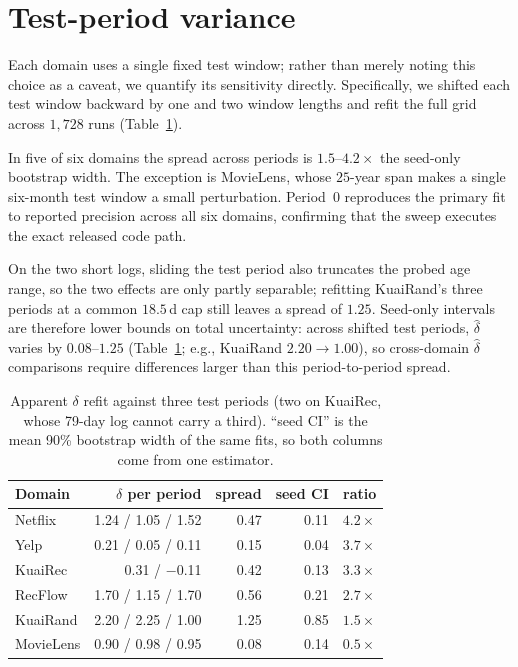 \documentclass[10pt,letterpaper]{article}
\begin{document}
\section{Test-period variance}
\label{sup:periods}

Each domain uses a single fixed test window; rather than merely noting this choice as a caveat, we quantify its sensitivity directly. Specifically, we shifted each
test window backward by one and two window lengths and refit the full grid across $1{,}728$ runs (Table~\ref{tab:periods}).

In five of six domains the spread across periods is $1.5$--$4.2\times$ the
seed-only bootstrap width. The exception is MovieLens, whose $25$-year span
makes a single six-month test window a small perturbation. Period~0
reproduces the primary fit to reported precision across all six domains,
confirming that the sweep executes the exact released code path.

On the two short logs, sliding the test period also truncates the probed age
range, so the two effects are only partly separable; refitting KuaiRand's
three periods at a common $18.5$\,d cap still leaves a spread of $1.25$.
Seed-only intervals are therefore lower bounds on total uncertainty: across
shifted test periods, $\hat\delta$ varies by $0.08$--$1.25$
(Table~\ref{tab:periods}; e.g., KuaiRand $2.20{\to}1.00$), so cross-domain
$\hat\delta$ comparisons require differences larger than this period-to-period spread.

\begin{table}[t]
\centering
\caption{Apparent $\delta$ refit against three test periods (two on
KuaiRec, whose 79-day log cannot carry a third). ``seed CI'' is the mean
90\% bootstrap width of the same fits, so both columns come from one
estimator.}
\label{tab:periods}
\small
\begin{tabular}{lrrrr}
\toprule
Domain & $\delta$ per period & spread & seed CI & ratio \\
\midrule
Netflix & 1.24 / 1.05 / 1.52 & 0.47 & 0.11 & $4.2\times$ \\
Yelp & 0.21 / 0.05 / 0.11 & 0.15 & 0.04 & $3.7\times$ \\
KuaiRec & 0.31 / $-$0.11 & 0.42 & 0.13 & $3.3\times$ \\
RecFlow & 1.70 / 1.15 / 1.70 & 0.56 & 0.21 & $2.7\times$ \\
KuaiRand & 2.20 / 2.25 / 1.00 & 1.25 & 0.85 & $1.5\times$ \\
MovieLens & 0.90 / 0.98 / 0.95 & 0.08 & 0.14 & $0.5\times$ \\
\bottomrule
\end{tabular}
\end{table}
\end{document}
